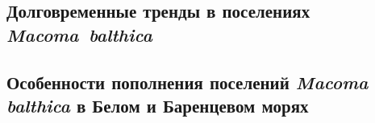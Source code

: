 \afterpage{\clearpage}

\subsection{Долговременные тренды в поселениях \textit{Macoma~balthica}}




\afterpage{\clearpage}
	\subsection{Особенности пополнения поселений \textit{Macoma balthica} в Белом и Баренцевом морях}


\afterpage{\clearpage}
